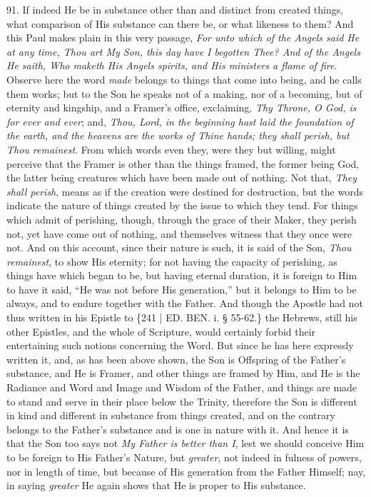 91. If indeed He be in
substance other than and distinct from created things, what comparison
of His substance can there be, or what likeness to them? And this Paul
makes plain in this very passage, \emph{For unto which of the Angels said
He at any time, Thou art My Son, this day have I begotten Thee? And of
the Angels He saith, Who maketh His Angels spirits, and His ministers
a flame of fire}. Observe here the word \emph{made} belongs to
things that come into being, and he calls them works; but to the Son
he speaks not of a making, nor of a becoming, but of eternity and
kingship, and a Framer's office, exclaiming, \emph{Thy Throne, O God, is
for ever and ever}; and, \emph{Thou, Lord, in the beginning hast laid
the foundation of the earth, and the heavens are the works of Thine
hands; they shall perish, but Thou remainest}. From which words
even they, were they but willing, might perceive that the Framer is
other than the things framed, the former being God, the latter being
creatures which have been made out of nothing. Not that, \emph{They shall
perish}, means as if the creation were destined for destruction,
but the words indicate the nature of things created by the issue to
which they tend. For things which admit of perishing, though, through
the grace of their Maker, they perish not, yet have come out of
nothing, and themselves witness that they once were not. And on this
account, since their nature is such, it is said of the Son, \emph{Thou
remainest}, to show His eternity; for not having the capacity of
perishing, as things have which began to be, but having eternal
duration, it is foreign to Him to have it said, ``He was not before His
generation,'' but it belongs to Him to be always, and to endure
together with the Father. And though the Apostle had not thus written
in his Epistle to \{241 | ED.
BEN.
i. § 55-62.\} the Hebrews, still his other Epistles, and the whole of
Scripture, would certainly forbid their entertaining such notions
concerning the Word. But since he has here expressly written it, and,
as has been above shown, the Son is Offspring of the Father's
substance, and He is Framer, and other things are framed by Him, and
He is the Radiance and Word and Image and Wisdom of the Father, and
things are made to stand and serve in their place below the Trinity,
therefore the Son is different in kind and different in substance from
things created, and on the contrary belongs to the Father's substance
and is one in nature with it. And hence it is that the Son too says
not \emph{My Father is better than I}, lest we should conceive Him to
be foreign to His Father's Nature, but \emph{greater}, not indeed in
fulness of powers, nor in length of time, but because of His
generation from the Father Himself; nay, in saying \emph{greater} He
again shows that He is proper to His substance.

